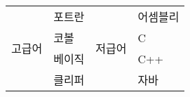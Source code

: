 \documentclass[12pt]{article}
\begin{document}
	
	\begin{tabular}{ l | l | l | l }
		\hline
		\multirow{4}{2cm}{고급어} & 포트란 & \multirow{4}{2cm}{저급어} & 어셈블리 \\ 
		& 코볼 & & C \\ 
		& 베이직 & & C++ \\ 
		& 클리퍼 & & 자바 \\ 
		\hline
	\end{tabular}
	
\end{document}
